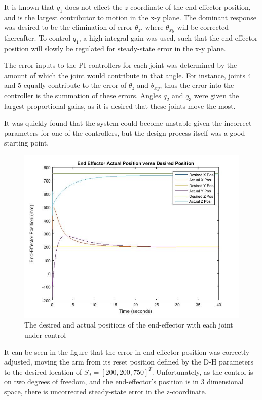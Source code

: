 \documentclass[12pt,openany,a4paper]{book}
\begin{document}
It is known that $q_1$ does not effect the $z$ coordinate of the end-effector position, and is the largest contributor to motion in the x-y plane. The dominant response was desired to be the elimination of error $\theta_z$, where $\theta_{xy}$ will be corrected thereafter. To control $q_1$, a high integral gain was used, such that the end-effector position will slowly be regulated for steady-state error in the x-y plane. 

The error inputs to the PI controllers for each joint was determined by the amount of which the joint would contribute in that angle. For instance, joints 4 and 5 equally contribute to the error of $\theta_z$ and $\theta_{xy}$, thus the error into the controller is the summation of these errors. Angles $q_2$ and $q_3$ were given the largest proportional gains, as it is desired that these joints move the most.

It was quickly found that the system could become unstable given the incorrect parameters for one of the controllers, but the design process itself was a good starting point.

\begin{center}
\begin{figure}[htb]
  \includegraphics[width=1\linewidth]{matlab_inv_des_act.jpg}
\caption{The desired and actual positions of the end-effector with each joint under control}
\end{figure}
\end{center}

It can be seen in the figure that the error in end-effector position was correctly adjusted, moving the arm from its reset position defined by the D-H parameters to the desired location of $S_d = [200, 200, 750]^T$. Unfortunately, as the control is on two degrees of freedom, and the end-effector's position is in 3 dimensional space, there is uncorrected steady-state error in the z-coordinate.
\end{document}
